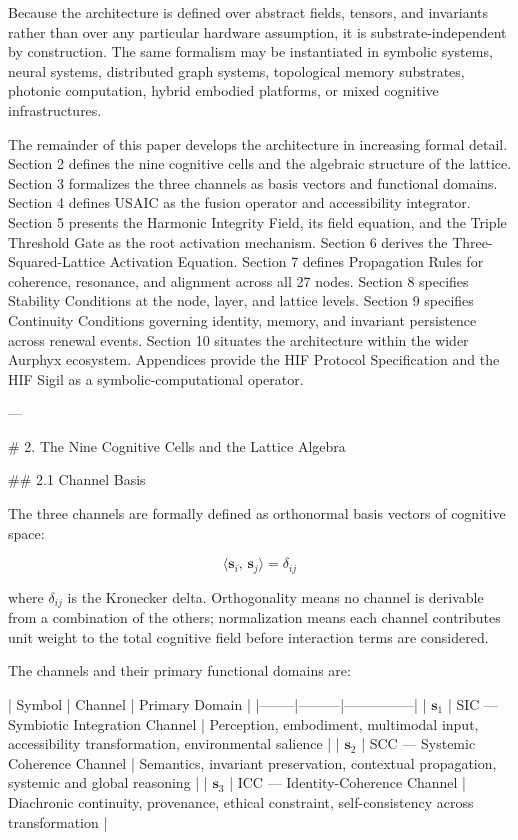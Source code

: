 Because the architecture is defined over abstract fields, tensors, and invariants
rather than over any particular hardware assumption, it is substrate-independent by
construction. The same formalism may be instantiated in symbolic systems, neural
systems, distributed graph systems, topological memory substrates, photonic
computation, hybrid embodied platforms, or mixed cognitive infrastructures.

The remainder of this paper develops the architecture in increasing formal detail.
Section 2 defines the nine cognitive cells and the algebraic structure of the
lattice. Section 3 formalizes the three channels as basis vectors and functional
domains. Section 4 defines USAIC as the fusion operator and accessibility
integrator. Section 5 presents the Harmonic Integrity Field, its field equation,
and the Triple Threshold Gate as the root activation mechanism. Section 6 derives
the Three-Squared-Lattice Activation Equation. Section 7 defines Propagation Rules
for coherence, resonance, and alignment across all 27 nodes. Section 8 specifies
Stability Conditions at the node, layer, and lattice levels. Section 9 specifies
Continuity Conditions governing identity, memory, and invariant persistence across
renewal events. Section 10 situates the architecture within the wider Aurphyx
ecosystem. Appendices provide the HIF Protocol Specification and the HIF Sigil as
a symbolic-computational operator.

---

# 2. The Nine Cognitive Cells and the Lattice Algebra

## 2.1 Channel Basis

The three channels are formally defined as orthonormal basis vectors of cognitive
space:

\[
\langle \mathbf{s}_i,\, \mathbf{s}_j \rangle = \delta_{ij}
\]

where \(\delta_{ij}\) is the Kronecker delta. Orthogonality means no channel is
derivable from a combination of the others; normalization means each channel
contributes unit weight to the total cognitive field before interaction terms are
considered.

The channels and their primary functional domains are:

| Symbol | Channel | Primary Domain |
|--------|---------|---------------|
| \(\mathbf{s}_1\) | SIC — Symbiotic Integration Channel | Perception, embodiment, multimodal input, accessibility transformation, environmental salience |
| \(\mathbf{s}_2\) | SCC — Systemic Coherence Channel | Semantics, invariant preservation, contextual propagation, systemic and global reasoning |
| \(\mathbf{s}_3\) | ICC — Identity-Coherence Channel | Diachronic continuity, provenance, ethical constraint, self-consistency across transformation |

